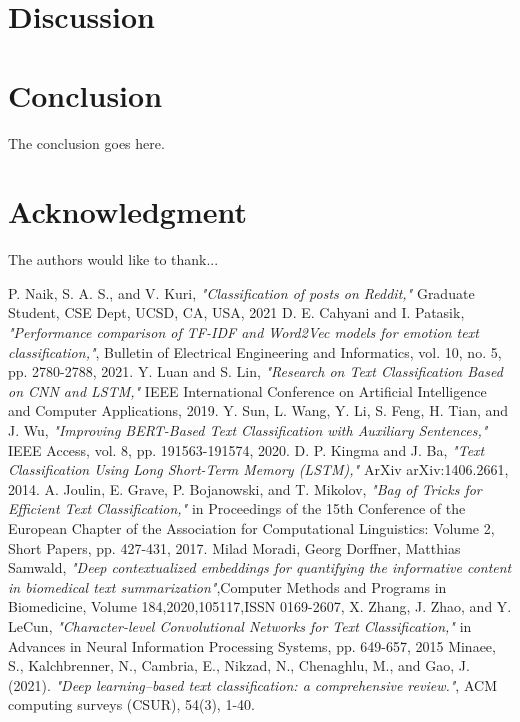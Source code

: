\documentclass[conference]{IEEEtran}
\begin{document}
\section{Discussion}

\section{Conclusion}
The conclusion goes here.






\section*{Acknowledgment}


The authors would like to thank...

\begin{thebibliography}{1}

P. Naik, S. A. S., and V. Kuri, \emph{"Classification of posts on Reddit,"} Graduate Student, CSE Dept, UCSD, CA, USA, 2021
D. E. Cahyani and I. Patasik, \emph{"Performance comparison of TF-IDF and Word2Vec models for emotion text classification,"}, Bulletin of Electrical Engineering and Informatics, vol. 10, no. 5, pp. 2780-2788, 2021.
Y. Luan and S. Lin, \emph{"Research on Text Classification Based on CNN and LSTM,"} IEEE International Conference on Artificial Intelligence and Computer Applications, 2019.
Y. Sun, L. Wang, Y. Li, S. Feng, H. Tian, and J. Wu, \emph{"Improving BERT-Based Text Classification with Auxiliary Sentences,"} IEEE Access, vol. 8, pp. 191563-191574, 2020.
D. P. Kingma and J. Ba, \emph{"Text Classification Using Long Short-Term Memory (LSTM),"} ArXiv arXiv:1406.2661, 2014.
A. Joulin, E. Grave, P. Bojanowski, and T. Mikolov, \emph{"Bag of Tricks for Efficient Text Classification,"} in Proceedings of the 15th Conference of the European Chapter of the Association for Computational Linguistics: Volume 2, Short Papers, pp. 427-431, 2017.
Milad Moradi, Georg Dorffner, Matthias Samwald,
\emph{"Deep contextualized embeddings for quantifying the informative content in biomedical text summarization"},Computer Methods and Programs in Biomedicine, Volume 184,2020,105117,ISSN 0169-2607,
X. Zhang, J. Zhao, and Y. LeCun, \emph{"Character-level Convolutional Networks for Text Classification,"} in Advances in Neural Information Processing Systems, pp. 649-657, 2015
Minaee, S., Kalchbrenner, N., Cambria, E., Nikzad, N., Chenaghlu, M., and  Gao, J. (2021). \emph{"Deep learning--based text classification: a comprehensive review."}, ACM computing surveys (CSUR), 54(3), 1-40.


\end{thebibliography}
\end{document}

